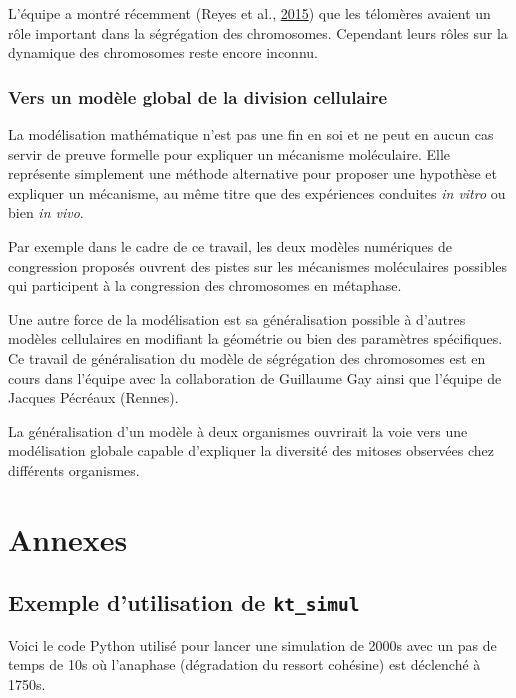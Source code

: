 \documentclass[12pt,a4paper,twoside,openright]{book}
\begin{document}
L'équipe a montré récemment (Reyes et al.,
\protect\hyperlink{ref-Reyes2015}{2015}) que les télomères avaient un
rôle important dans la ségrégation des chromosomes. Cependant leurs
rôles sur la dynamique des chromosomes reste encore inconnu.

\subsection{Vers un modèle global de la division
cellulaire}\label{vers-un-moduxe8le-global-de-la-division-cellulaire}

La modélisation mathématique n'est pas une fin en soi et ne peut en
aucun cas servir de preuve formelle pour expliquer un mécanisme
moléculaire. Elle représente simplement une méthode alternative pour
proposer une hypothèse et expliquer un mécanisme, au même titre que des
expériences conduites \emph{in vitro} ou bien \emph{in vivo}.

Par exemple dans le cadre de ce travail, les deux modèles numériques de
congression proposés ouvrent des pistes sur les mécanismes moléculaires
possibles qui participent à la congression des chromosomes en métaphase.

Une autre force de la modélisation est sa généralisation possible à
d'autres modèles cellulaires en modifiant la géométrie ou bien des
paramètres spécifiques. Ce travail de généralisation du modèle de
ségrégation des chromosomes est en cours dans l'équipe avec la
collaboration de Guillaume Gay ainsi que l'équipe de Jacques Pécréaux
(Rennes).

La généralisation d'un modèle à deux organismes ouvrirait la voie vers
une modélisation globale capable d'expliquer la diversité des mitoses
observées chez différents organismes.

\clearpage\null

\appendix

\chapter{Annexes}\label{annexes}

\section{\texorpdfstring{Exemple d'utilisation de
\texttt{kt\_simul}}{Exemple d'utilisation de kt\_simul}}\label{exemple-dutilisation-de-ktux5fsimul}

\label{sec:ktsimul}

Voici le code Python utilisé pour lancer une simulation de 2000s avec un
pas de temps de 10s où l'anaphase (dégradation du ressort cohésine) est
déclenché à 1750s.
\end{document}
